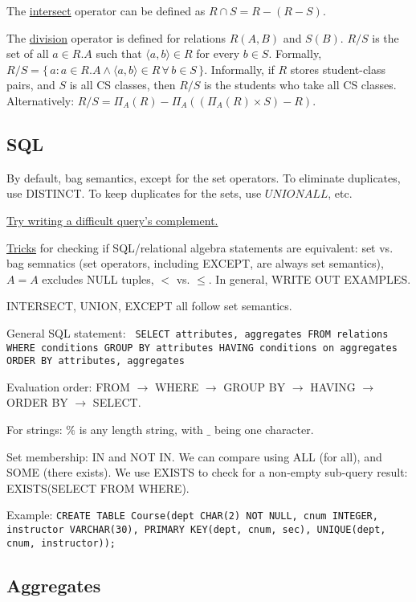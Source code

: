 \documentclass[10pt,letterpaper,twocolumn]{article}
\begin{document}
The \underline{intersect} operator can be defined as 
$ R \cap S = R - (R - S) $.

The \underline{division} operator is defined for relations $ R(A, B) $
and $ S(B) $. $ R / S $ is the set of all $ a \in R.A $ such that
$ \langle a, b \rangle \in R $ for every $ b \in S $. Formally, 
$ R / S = \{ \, a : a \in R.A \land \langle a, b \rangle \in R \, \forall \, b \in S \, \} $. Informally, if $ R $ stores student-class pairs, and
$ S $ is all CS classes, then $ R / S $ is the students who take all
CS classes. Alternatively: $ R / S = \Pi_A(R) - \Pi_A((\Pi_A(R) \times S) - R) $.


\subsection{SQL} 

By default, bag semantics, except for the set operators. 
To eliminate duplicates, use DISTINCT. To keep duplicates
for the sets, use $ UNION ALL $, etc.

\underline{Try writing a difficult query's complement.}

\underline{Tricks} for checking if SQL/relational algebra 
statements are equivalent: set vs. bag semnatics (set operators,
including EXCEPT, are always set semantics), $ A = A $ excludes
NULL tuples, $ < $ vs. $ \le $. In general, WRITE OUT EXAMPLES.

INTERSECT, UNION, EXCEPT all follow set semantics.

General SQL statement: \texttt{
    SELECT attributes, aggregates
    FROM relations
    WHERE conditions
    GROUP BY attributes
    HAVING conditions on aggregates
    ORDER BY attributes, aggregates
}

Evaluation order: FROM $ \to $ WHERE $ \to $ GROUP BY $ \to $ HAVING 
$ \to $ ORDER BY $ \to $ SELECT.

For strings: $ \% $ is any length string, with $ \_ $ being one 
character. 

Set membership: IN and NOT IN. We can compare using ALL (for all), 
and SOME (there exists). We use EXISTS to check for a non-empty 
sub-query result: EXISTS(SELECT FROM WHERE).

Example: \texttt{CREATE TABLE Course(dept CHAR(2) NOT NULL, cnum INTEGER, 
instructor VARCHAR(30), PRIMARY KEY(dept, cnum, sec), UNIQUE(dept, 
cnum, instructor));}


\subsection{Aggregates} 
\end{document}
